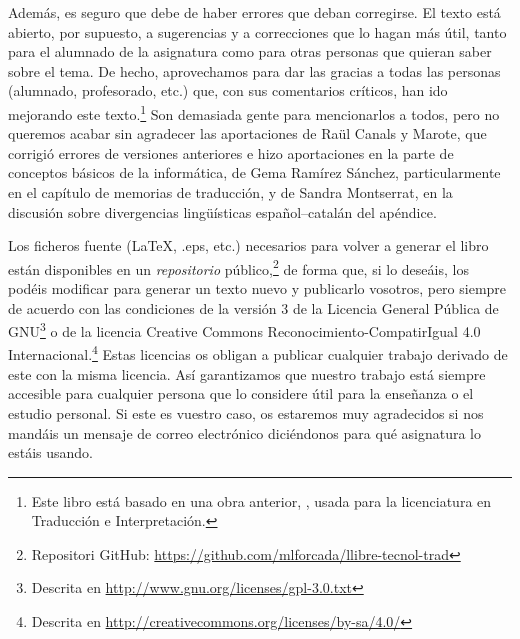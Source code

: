 Además, es seguro que debe de haber errores que deban corregirse. El texto está abierto, por supuesto, a sugerencias y a correcciones que lo hagan más útil, tanto para el alumnado de la asignatura como para otras personas que quieran saber sobre el tema. De hecho, aprovechamos para dar las gracias a todas las personas (alumnado, profesorado, etc.) que, con sus comentarios críticos, han ido mejorando este texto.\footnote{Este libro está basado en una obra anterior, \protect\citep{forcada09b}, usada para la licenciatura en Traducción e Interpretación.} Son demasiada gente para mencionarlos a todos, pero no queremos acabar sin agradecer las aportaciones de Raül Canals y Marote, que corrigió errores de versiones anteriores e hizo aportaciones en la parte de conceptos básicos de la informática, de Gema Ramírez Sánchez, particularmente en el capítulo de memorias de traducción, y de Sandra Montserrat, en la discusión sobre divergencias lingüísticas español--catalán del apéndice. 

Los ficheros fuente (\LaTeX, .eps, etc.) necesarios para volver a generar el libro están disponibles en un \emph{repositorio} público,\footnote{Repositori GitHub: \url{https://github.com/mlforcada/llibre-tecnol-trad}} de forma que, si lo deseáis, los podéis modificar para generar un texto nuevo y publicarlo vosotros, pero siempre de acuerdo con las condiciones de la versión 3 de la Licencia General Pública de GNU\footnote{Descrita en \url{http://www.gnu.org/licenses/gpl-3.0.txt}} o de la licencia Creative Commons Reconocimiento-CompatirIgual 4.0 Internacional.\footnote{Descrita en \url{http://creativecommons.org/licenses/by-sa/4.0/}} Estas licencias os obligan a publicar cualquier trabajo derivado de este con la misma licencia. Así garantizamos que nuestro trabajo está siempre accesible para cualquier persona que lo considere útil para la enseñanza o el estudio personal. Si este es vuestro caso, os estaremos muy agradecidos si nos mandáis un mensaje de correo electrónico diciéndonos para qué asignatura lo estáis usando. 
